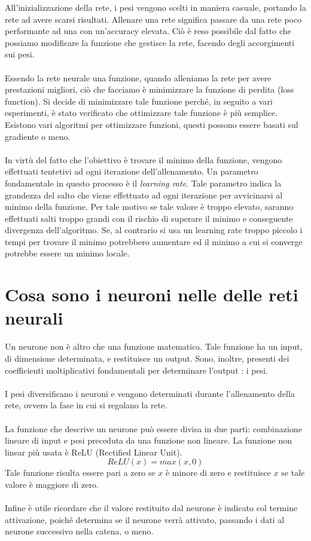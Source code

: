 All'inizializzazione della rete, i pesi vengono scelti in maniera casuale, portando la rete 
ad avere scarsi risultati. Allenare una rete significa passare da una rete poco performante ad 
una con un'accuracy elevata. Ciò è reso possibile dal fatto che possiamo modificare la funzione 
che gestisce la rete, facendo degli accorgimenti sui pesi.
\\\\
Essendo la rete neurale una funzione, quando alleniamo la rete per avere prestazioni migliori,
ciò che facciamo è minimizzare la funzione di perdita (loss function). Si decide di minimizzare tale 
funzione perché, in seguito a vari esperimenti, è stato verificato che ottimizzare tale funzione 
è più semplice. Esistono vari  algoritmi per ottimizzare funzioni, questi possono essere basati sul 
gradiente o meno.
\\\\
In virtù del fatto che l'obiettivo è trovare il minimo della funzione, vengono effettuati tentetivi
ad ogni iterazione dell'allenamento. Un parametro fondamentale in questo processo è il \emph{learning rate}.
Tale parametro indica la grandezza del salto che viene effettuato ad ogni iterazione per avvicinarsi al 
minimo della funzione. Per tale motivo se tale valore è troppo elevato, saranno effettuati salti 
troppo grandi con il rischio di superare il minimo e conseguente divergenza dell'algoritmo.
Se, al contrario si usa un learning rate troppo piccolo i tempi per trovare il minimo potrebbero aumentare 
ed il minimo a cui si converge potrebbe essere un minimo locale.

\section{Cosa sono i neuroni nelle delle reti neurali}
\label{neuroni}
Un neurone non è altro che una funzione matematica. Tale funzione ha un input, di dimensione 
determinata, e restituisce un output. Sono, inoltre, presenti 
dei coefficienti moltiplicativi fondamentali per determinare l'output : i pesi.
\\\\
I pesi diversificano i neuroni e vengono determinati durante l'allenamento della rete, ovvero la 
fase in cui si regolano la rete.
\\\\
La funzione che descrive un neurone può essere divisa in due parti: combinazione lineare di 
input e pesi preceduta da una funzione non lineare. La funzione non linear più usata è ReLU (Rectified 
Linear Unit).
\begin{equation*}
    ReLU(x)=max(x,0)
\end{equation*}
Tale funzione risulta essere pari a zero se $x$ è minore di zero e restituisce $x$ se tale valore 
è maggiore di zero.
\\\\
Infine è utile ricordare che il valore restituito dal neurone è indicato col termine attivazione, 
poiché determina se il neurone verrà attivato, passando i dati al neurone successivo nella catena, o meno.
